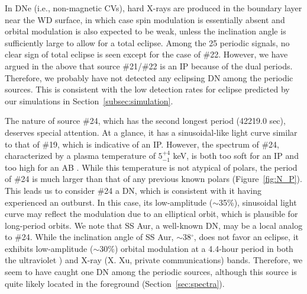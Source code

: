 \documentclass[fleqn,usenatbib]{mnras}
\begin{document}
In DNe (i.e., non-magnetic CVs), hard X-rays are produced in the boundary layer near the WD surface, in which case spin modulation is essentially absent and orbital modulation is also expected to be weak, unless the inclination angle is sufficiently large to allow for a total eclipse. Among the 25 periodic signals, no clear sign of total eclipse is seen except for the case of \#22. However, we have argued in the above that source \#21/\#22 is an IP because of the dual periods. Therefore, we probably have not detected any eclipsing DN among the periodic sources. This is consistent with the low detection rates for eclipse predicted by our simulations in Section~\ref{subsec:simulation}. 

The nature of source \#24, which has the second longest period (42219.0 sec), deserves special attention. At a glance, it has a sinusoidal-like light curve similar to that of \#19, which is indicative of an IP. However, the spectrum of \#24, characterized by a plasma temperature of $5^{+4}_{-1}$ keV, is both too soft for an IP \citep{2016ApJ...818..136X}
and too high for an AB \citep{2004A&ARv..12...71G}. 
While this temperature is not atypical of polars, the period of \#24 is much larger than that of any previous known polars (Figure~\ref{fig:N_P}). 
This leads us to consider \#24 a DN, which is consistent with it having experienced an outburst.  In this case, its low-amplitude ($\sim$35\%), sinusoidal light curve may reflect the modulation due to an elliptical orbit, which is plausible for long-period orbits. 
We note that SS Aur, a well-known DN, may be a local analog to \#24. 
While the inclination angle of SS Aur,  $\sim$38$^\circ$, does not favor an eclipse, it exhibits low-amplitude ($\sim30\%$) orbital modulation at a 4.4-hour period in both the ultraviolet  \citealt{1983ApJ...271..754W,1986Afz....24..227E}) and X-ray (X. Xu, private communications) bands.
Therefore, we seem to have caught one DN among the periodic sources, although this source is quite likely located in the foreground (Section~\ref{sec:spectra}).
\end{document}
